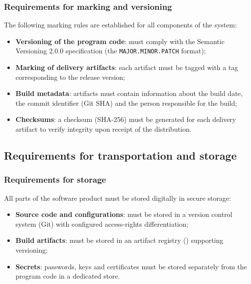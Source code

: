 \documentclass[12pt,a4paper]{extarticle}
\begin{document}
\subsubsection{Requirements for marking and versioning}

\begin{hseExample}
The following marking rules are established for all components of the system:
\begin{itemize}[nosep, leftmargin=1.25cm]
    \item \textbf{Versioning of the program code}: must comply with the Semantic Versioning 2.0.0 specification (the \texttt{MAJOR.MINOR.PATCH} format);
    \item \textbf{Marking of delivery artifacts}: each artifact must be tagged with a tag corresponding to the release version;
    \item \textbf{Build metadata}: artifacts must contain information about the build date, the commit identifier (Git SHA) and the person responsible for the build;
    \item \textbf{Checksums}: a checksum (SHA-256) must be generated for each delivery artifact to verify integrity upon receipt of the distribution.
\end{itemize}
\end{hseExample}

\subsection{Requirements for transportation and storage}

\subsubsection{Requirements for storage}

\begin{hseExample}
All parts of the software product must be stored digitally in secure storage:
\begin{itemize}[nosep, leftmargin=1.25cm]
    \item \textbf{Source code and configurations}: must be stored in a version control system (Git) with configured access-rights differentiation;
    \item \textbf{Build artifacts}: must be stored in an artifact registry () supporting versioning;
    \item \textbf{Secrets}: passwords, keys and certificates must be stored separately from the program code in a dedicated store.
\end{itemize}
\end{hseExample}
\end{document}
